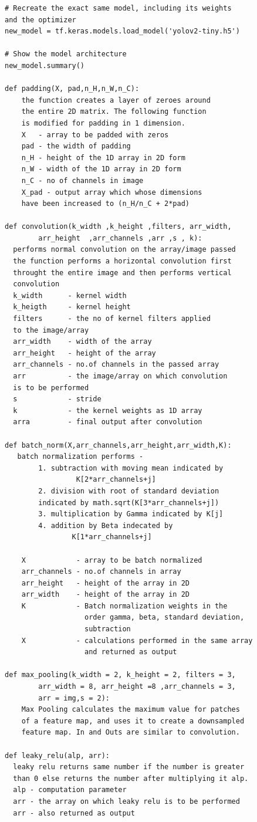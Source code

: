 \documentclass[a4paper,12pt,oneside]{book}
\begin{document}
\begin{lstlisting}
# Recreate the exact same model, including its weights
and the optimizer
new_model = tf.keras.models.load_model('yolov2-tiny.h5')

# Show the model architecture
new_model.summary()

def padding(X, pad,n_H,n_W,n_C): 
    the function creates a layer of zeroes around
    the entire 2D matrix. The following function
    is modified for padding in 1 dimension.
    X   - array to be padded with zeros
    pad - the width of padding
    n_H - height of the 1D array in 2D form
    n_W - width of the 1D array in 2D form
    n_C - no of channels in image
    X_pad - output array which whose dimensions
    have been increased to (n_H/n_C + 2*pad)

def convolution(k_width ,k_height ,filters, arr_width,
        arr_height  ,arr_channels ,arr ,s , k):
  performs normal convolution on the array/image passed
  the function performs a horizontal convolution first
  throught the entire image and then performs vertical
  convolution
  k_width      - kernel width
  k_heigth     - kernel height
  filters      - the no of kernel filters applied
  to the image/array
  arr_width    - width of the array
  arr_height   - height of the array
  arr_channels - no.of channels in the passed array
  arr          - the image/array on which convolution
  is to be performed
  s            - stride
  k            - the kernel weights as 1D array
  arra         - final output after convolution

def batch_norm(X,arr_channels,arr_height,arr_width,K):
   batch normalization performs - 
        1. subtraction with moving mean indicated by
                 K[2*arr_channels+j]
        2. division with root of standard deviation 
        indicated by math.sqrt(K[3*arr_channels+j])
        3. multiplication by Gamma indicated by K[j]
        4. addition by Beta indecated by 
                K[1*arr_channels+j]

    X            - array to be batch normalized
    arr_channels - no.of channels in array
    arr_height   - height of the array in 2D
    arr_width    - height of the array in 2D
    K            - Batch normalization weights in the
                   order gamma, beta, standard deviation,
                   subtraction
    X            - calculations performed in the same array
                   and returned as output

def max_pooling(k_width = 2, k_height = 2, filters = 3,
        arr_width = 8, arr_height =8 ,arr_channels = 3,
        arr = img,s = 2):
    Max Pooling calculates the maximum value for patches 
    of a feature map, and uses it to create a downsampled
    feature map. In and Outs are similar to convolution.

def leaky_relu(alp, arr):
  leaky relu returns same number if the number is greater
  than 0 else returns the number after multiplying it alp.
  alp - computation parameter
  arr - the array on which leaky relu is to be performed
  arr - also returned as output

\end{lstlisting}
\end{document}
